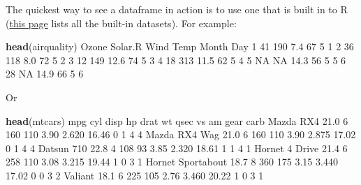 \documentclass[]{article}
\newenvironment{Shaded}{\begin{snugshade}}{\end{snugshade}}
\newcommand{\DecValTok}[1]{\textcolor[rgb]{0.00,0.00,0.81}{#1}}
\newcommand{\FloatTok}[1]{\textcolor[rgb]{0.00,0.00,0.81}{#1}}
\newcommand{\KeywordTok}[1]{\textcolor[rgb]{0.13,0.29,0.53}{\textbf{#1}}}
\newcommand{\NormalTok}[1]{#1}
\newcommand{\OtherTok}[1]{\textcolor[rgb]{0.56,0.35,0.01}{#1}}
\begin{document}
The quickest way to see a dataframe in action is to use one that is built in to
R
(\href{https://stat.ethz.ch/R-manual/R-devel/library/datasets/html/00Index.html}{this page}
lists all the built-in datasets). For example:

\begin{Shaded}
\begin{Highlighting}[]
\KeywordTok{head}\NormalTok{(airquality)}
\NormalTok{  Ozone Solar.R Wind Temp Month Day}
\DecValTok{1}    \DecValTok{41}     \DecValTok{190}  \FloatTok{7.4}   \DecValTok{67}     \DecValTok{5}   \DecValTok{1}
\DecValTok{2}    \DecValTok{36}     \DecValTok{118}  \FloatTok{8.0}   \DecValTok{72}     \DecValTok{5}   \DecValTok{2}
\DecValTok{3}    \DecValTok{12}     \DecValTok{149} \FloatTok{12.6}   \DecValTok{74}     \DecValTok{5}   \DecValTok{3}
\DecValTok{4}    \DecValTok{18}     \DecValTok{313} \FloatTok{11.5}   \DecValTok{62}     \DecValTok{5}   \DecValTok{4}
\DecValTok{5}    \OtherTok{NA}      \OtherTok{NA} \FloatTok{14.3}   \DecValTok{56}     \DecValTok{5}   \DecValTok{5}
\DecValTok{6}    \DecValTok{28}      \OtherTok{NA} \FloatTok{14.9}   \DecValTok{66}     \DecValTok{5}   \DecValTok{6}
\end{Highlighting}
\end{Shaded}

Or

\begin{Shaded}
\begin{Highlighting}[]
\KeywordTok{head}\NormalTok{(mtcars)}
\NormalTok{                   mpg cyl disp  hp drat    wt  qsec vs am gear carb}
\NormalTok{Mazda RX4         }\FloatTok{21.0}   \DecValTok{6}  \DecValTok{160} \DecValTok{110} \FloatTok{3.90} \FloatTok{2.620} \FloatTok{16.46}  \DecValTok{0}  \DecValTok{1}    \DecValTok{4}    \DecValTok{4}
\NormalTok{Mazda RX4 Wag     }\FloatTok{21.0}   \DecValTok{6}  \DecValTok{160} \DecValTok{110} \FloatTok{3.90} \FloatTok{2.875} \FloatTok{17.02}  \DecValTok{0}  \DecValTok{1}    \DecValTok{4}    \DecValTok{4}
\NormalTok{Datsun }\DecValTok{710}        \FloatTok{22.8}   \DecValTok{4}  \DecValTok{108}  \DecValTok{93} \FloatTok{3.85} \FloatTok{2.320} \FloatTok{18.61}  \DecValTok{1}  \DecValTok{1}    \DecValTok{4}    \DecValTok{1}
\NormalTok{Hornet }\DecValTok{4}\NormalTok{ Drive    }\FloatTok{21.4}   \DecValTok{6}  \DecValTok{258} \DecValTok{110} \FloatTok{3.08} \FloatTok{3.215} \FloatTok{19.44}  \DecValTok{1}  \DecValTok{0}    \DecValTok{3}    \DecValTok{1}
\NormalTok{Hornet Sportabout }\FloatTok{18.7}   \DecValTok{8}  \DecValTok{360} \DecValTok{175} \FloatTok{3.15} \FloatTok{3.440} \FloatTok{17.02}  \DecValTok{0}  \DecValTok{0}    \DecValTok{3}    \DecValTok{2}
\NormalTok{Valiant           }\FloatTok{18.1}   \DecValTok{6}  \DecValTok{225} \DecValTok{105} \FloatTok{2.76} \FloatTok{3.460} \FloatTok{20.22}  \DecValTok{1}  \DecValTok{0}    \DecValTok{3}    \DecValTok{1}
\end{Highlighting}
\end{Shaded}
\end{document}
